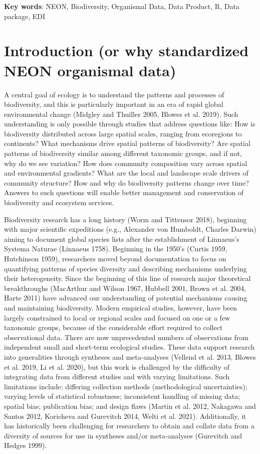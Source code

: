 \documentclass[
  12pt,
]{article}
\begin{document}
\textbf{Key words}: NEON, Biodiversity, Organismal Data, Data Product, R, Data package, EDI

\hypertarget{introduction-or-why-standardized-neon-organismal-data}{%
\section{Introduction (or why standardized NEON organismal data)}\label{introduction-or-why-standardized-neon-organismal-data}}

A central goal of ecology is to understand the patterns and processes of biodiversity, and this is particularly important in an era of rapid global environmental change (Midgley and Thuiller 2005, Blowes et al. 2019). Such understanding is only possible through studies that address questions like: How is biodiversity distributed across large spatial scales, ranging from ecoregions to continents? What mechanisms drive spatial patterns of biodiversity? Are spatial patterns of biodiversity similar among different taxonomic groups, and if not, why do we see variation? How does community composition vary across spatial and environmental gradients? What are the local and landscape scale drivers of community structure? How and why do biodiversity patterns change over time? Answers to such questions will enable better management and conservation of biodiversity and ecosystem services.

Biodiversity research has a long history (Worm and Tittensor 2018), beginning with major scientific expeditions (e.g., Alexander von Humboldt, Charles Darwin) aiming to document global species lists after the establishment of Linnaeus's Systema Naturae (Linnaeus 1758). Beginning in the 1950's (Curtis 1959, Hutchinson 1959), researchers moved beyond documentation to focus on quantifying patterns of species diversity and describing mechanisms underlying their heterogeneity. Since the beginning of this line of research major theoretical breakthroughs (MacArthur and Wilson 1967, Hubbell 2001, Brown et al. 2004, Harte 2011) have advanced our understanding of potential mechanisms causing and maintaining biodiversity. Modern empirical studies, however, have been largely constrained to local or regional scales and focused on one or a few taxonomic groups, because of the considerable effort required to collect observational data. There are now unprecedented numbers of observations from independent small and short-term ecological studies. These data support research into generalities through syntheses and meta-analyses (Vellend et al. 2013, Blowes et al. 2019, Li et al. 2020), but this work is challenged by the difficulty of integrating data from different studies and with varying limitations. Such limitations include: differing collection methods (methodological uncertainties); varying levels of statistical robustness; inconsistent handling of missing data; spatial bias; publication bias; and design flaws (Martin et al. 2012, Nakagawa and Santos 2012, Koricheva and Gurevitch 2014, Welti et al. 2021). Additionally, it has historically been challenging for researchers to obtain and collate data from a diversity of sources for use in syntheses and/or meta-analyses (Gurevitch and Hedges 1999).
\end{document}

